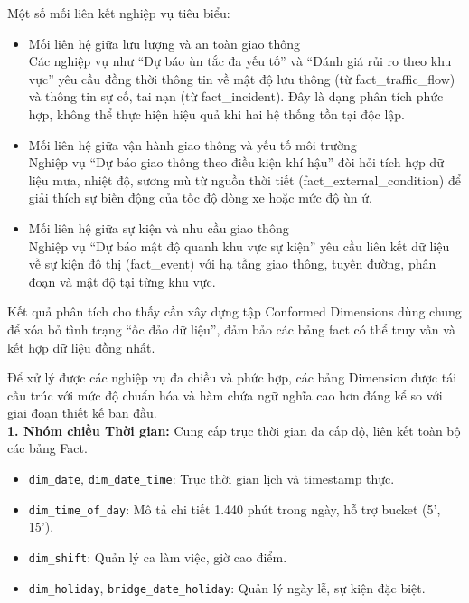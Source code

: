 Một số mối liên kết nghiệp vụ tiêu biểu:
\begin{itemize}
    \item Mối liên hệ giữa lưu lượng và an toàn giao thông\\
    Các nghiệp vụ như “Dự báo ùn tắc đa yếu tố” và “Đánh giá rủi ro theo khu vực” yêu cầu đồng thời thông tin về mật độ lưu thông (từ fact\_traffic\_flow) và thông tin sự cố, tai nạn (từ fact\_incident). Đây là dạng phân tích phức hợp, không thể thực hiện hiệu quả khi hai hệ thống tồn tại độc lập.
    \item Mối liên hệ giữa vận hành giao thông và yếu tố môi trường \\
    Nghiệp vụ “Dự báo giao thông theo điều kiện khí hậu” đòi hỏi tích hợp dữ liệu mưa, nhiệt độ, sương mù từ nguồn thời tiết (fact\_external\_condition) để giải thích sự biến động của tốc độ dòng xe hoặc mức độ ùn ứ.
    \item Mối liên hệ giữa sự kiện và nhu cầu giao thông\\
    Nghiệp vụ “Dự báo mật độ quanh khu vực sự kiện” yêu cầu liên kết dữ liệu về sự kiện đô thị (fact\_event) với hạ tầng giao thông, tuyến đường, phân đoạn và mật độ tại từng khu vực.

\end{itemize}

Kết quả phân tích cho thấy cần xây dựng tập Conformed Dimensions dùng chung để xóa bỏ tình trạng “ốc đảo dữ liệu”, đảm bảo các bảng fact có thể truy vấn và kết hợp dữ liệu đồng nhất.


Để xử lý được các nghiệp vụ đa chiều và phức hợp, các bảng Dimension được tái cấu trúc với mức độ chuẩn hóa và hàm chứa ngữ nghĩa cao hơn đáng kể so với giai đoạn thiết kế ban đầu.\\

\textbf{1. Nhóm chiều Thời gian:}
Cung cấp trục thời gian đa cấp độ, liên kết toàn bộ các bảng Fact.
\begin{itemize}
    \item \texttt{dim\_date}, \texttt{dim\_date\_time}: Trục thời gian lịch và timestamp thực.
    \item \texttt{dim\_time\_of\_day}: Mô tả chi tiết 1.440 phút trong ngày, hỗ trợ bucket (5', 15').
    \item \texttt{dim\_shift}: Quản lý ca làm việc, giờ cao điểm.
    \item \texttt{dim\_holiday}, \texttt{bridge\_date\_holiday}: Quản lý ngày lễ, sự kiện đặc biệt.
\end{itemize}

